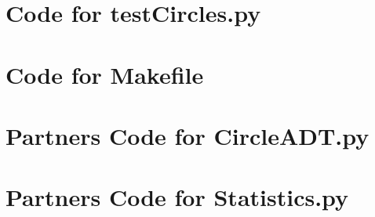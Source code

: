 \documentclass[12pt]{article}
\begin{document}
\newpage

\section{Code for testCircles.py} \label{CircleSect}

\noindent 

\newpage

\section{Code for Makefile} \label{CircleSect}

\noindent 

\newpage

\section{Partners Code for CircleADT.py} \label{CircleSect}

\noindent 

\newpage

\section{Partners Code for Statistics.py} \label{CircleSect}

\noindent 

\newpage
\end{document}
